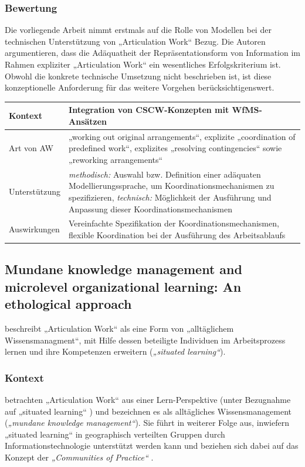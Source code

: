 \subsubsection{Bewertung}

Die vorliegende Arbeit nimmt erstmals auf die Rolle von Modellen bei der technischen Unterstützung von „Articulation Work“ Bezug. Die Autoren argumentieren, dass die Adäquatheit der Repräsentationsform von Information im Rahmen expliziter „Articulation Work“ ein wesentliches Erfolgskriterium ist. Obwohl die konkrete technische Umsetzung nicht beschrieben ist, ist diese konzeptionelle Anforderung für das weitere Vorgehen berücksichtigenswert.
\\[1em]
\begin{tabular}{| p{3cm} | p{10cm} |}
  \hline
  Kontext & Integration von \gls{CSCW}-Konzepten mit \gls{WfMS}-Ansätzen \\ \hline
  Art von AW & „working out original arrangements“, explizite „coordination of predefined work“, explizites „resolving contingencies“ sowie „reworking arrangements“  \\ \hline
  Unterstützung & \emph{methodisch:} Auswahl bzw. Definition einer adäquaten Modellierungssprache, um Koordinationsmechanismen zu spezifizieren, \emph{technisch:} Möglichkeit der Ausführung und Anpassung dieser Koordinationsmechanismen \\ \hline
  Auswirkungen & Vereinfachte Spezifikation der Koordinationsmechanismen, flexible Koordination bei der Ausführung des Arbeitsablaufs\\ \hline
\end{tabular}

\subsection{Mundane knowledge management and microlevel organizational learning: An ethological approach}

\citet{Davenport02} beschreibt „Articulation Work“ als eine Form von „alltäglichem Wissensmanagment“, mit Hilfe dessen beteiligte Individuen im Arbeitsprozess lernen und ihre Kompetenzen erweitern (\emph{„situated learning“}).

\subsubsection{Kontext}

\citet{Davenport02} betrachten „Articulation Work“ aus einer Lern-Perspektive (unter Bezugnahme auf „situated learning“ \citep{Lave91}) und bezeichnen es als alltägliches Wissensmanagement (\emph{„mundane knowledge management“}). Sie führt in weiterer Folge aus, inwiefern „situated learning“ in geographisch verteilten Gruppen durch Informationstechnologie unterstützt werden kann und beziehen sich dabei auf das Konzept der \emph{„Communities of Practice“} \citep{Wenger99}. 

